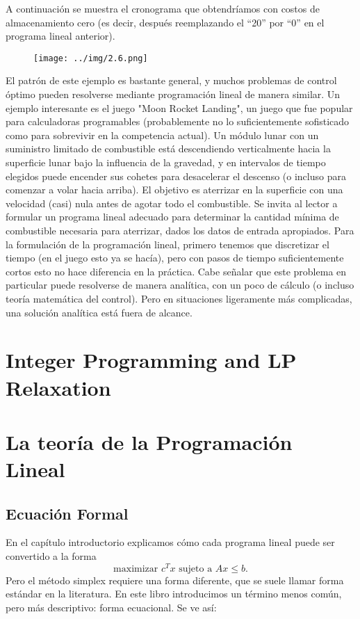 \documentclass{article}
\begin{document}
A continuación se muestra el cronograma que obtendríamos con costos de almacenamiento cero (es decir, después reemplazando el “20” por “0” en el programa lineal anterior). 
\begin{figure}[H] %
\centering %
\texttt{[image: ../img/2.6.png]} %
\label{fig:imagen} %
\end{figure}

El patrón de este ejemplo es bastante general, y muchos problemas de control óptimo pueden resolverse mediante programación lineal de manera similar. Un ejemplo interesante es el juego "Moon Rocket Landing", un juego que fue popular para calculadoras programables (probablemente no lo suficientemente sofisticado como para sobrevivir en la competencia actual). Un módulo lunar con un suministro limitado de combustible está descendiendo verticalmente hacia la superficie lunar bajo la influencia de la gravedad, y en intervalos de tiempo elegidos puede encender sus cohetes para desacelerar el descenso (o incluso para comenzar a volar hacia arriba). El objetivo es aterrizar en la superficie con una velocidad (casi) nula antes de agotar todo el combustible. Se invita al lector a formular un programa lineal adecuado para determinar la cantidad mínima de combustible necesaria para aterrizar, dados los datos de entrada apropiados. Para la formulación de la programación lineal, primero tenemos que discretizar el tiempo (en el juego esto ya se hacía), pero con pasos de tiempo suficientemente cortos esto no hace diferencia en la práctica. Cabe señalar que este problema en particular puede resolverse de manera analítica, con un poco de cálculo (o incluso teoría matemática del control). Pero en situaciones ligeramente más complicadas, una solución analítica está fuera de alcance.

\newpage

\section{Integer Programming and LP Relaxation}


\newpage

\section{La teoría de la Programación Lineal}
\subsection{Ecuación Formal}
En el capítulo introductorio explicamos cómo cada programa lineal puede ser convertido a la forma
\[
\text{maximizar } c^T x \text{ sujeto a } Ax \leq b.
\]
Pero el método simplex requiere una forma diferente, que se suele llamar forma estándar en la literatura. En este libro introducimos un término menos común, pero más descriptivo: forma ecuacional. Se ve así:
\end{document}
